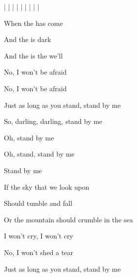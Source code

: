 

\ifdefined\TPBAND
  |  |  |   |  |   |   |   |  |
\fi

\zs
When the  has come

And the  is dark

And the  is the  we'll 

No, I won't be afraid

No, I won't be afraid

Just as long as you stand, stand by me
\ks

\zr
So, darling, darling, stand by me

Oh, stand by me

Oh, stand, stand by me

Stand by me
\kr

\zs
If the sky that we look upon

Should tumble and fall

Or the mountain should crumble in the sea

I won't cry, I won't cry

No, I won't shed a tear

Just as long as you stand, stand by me
\ks

\kp
